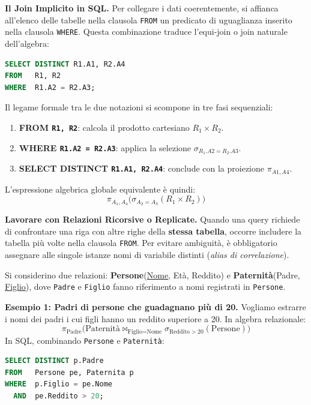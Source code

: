 \documentclass[12pt]{extarticle}
\begin{document}
\medskip
\noindent \textbf{Il Join Implicito in SQL.} Per collegare i dati coerentemente, si affianca all'elenco delle tabelle nella clausola \texttt{FROM} un predicato di uguaglianza inserito nella clausola \texttt{WHERE}. Questa combinazione traduce l'equi-join o join naturale dell'algebra:
\begin{lstlisting}[language=SQL]
SELECT DISTINCT R1.A1, R2.A4
FROM   R1, R2
WHERE  R1.A2 = R2.A3;
\end{lstlisting}

\medskip
\noindent Il legame formale tra le due notazioni si scompone in tre fasi sequenziali:
\begin{enumerate}
    \item \textbf{FROM \texttt{R1, R2}}: calcola il prodotto cartesiano $R_1 \times R_2$.
    \item \textbf{WHERE \texttt{R1.A2 = R2.A3}}: applica la selezione $\sigma_{R_1.A2 = R_2.A3}$.
    \item \textbf{SELECT DISTINCT \texttt{R1.A1, R2.A4}}: conclude con la proiezione $\pi_{A1, A4}$.
\end{enumerate}
L'espressione algebrica globale equivalente è quindi:
\[
\pi_{A_1, A_4}\big(\sigma_{A_2 = A_3}(R_1 \times R_2)\big)
\]

\noindent \textbf{Lavorare con Relazioni Ricorsive o Replicate.} Quando una query richiede di confrontare una riga con altre righe della \textbf{stessa tabella}, occorre includere la tabella più volte nella clausola \texttt{FROM}. Per evitare ambiguità, è obbligatorio assegnare alle singole istanze nomi di variabile distinti (\textit{alias di correlazione}).

\medskip
\noindent Si considerino due relazioni: \textbf{Persone}(\underline{Nome}, Età, Reddito) e \textbf{Paternità}(Padre, \underline{Figlio}), dove \texttt{Padre} e \texttt{Figlio} fanno riferimento a nomi registrati in \texttt{Persone}.

\medskip
\noindent \textbf{Esempio 1: Padri di persone che guadagnano più di 20.}
Vogliamo estrarre i nomi dei padri i cui figli hanno un reddito superiore a 20. In algebra relazionale:
\[
\pi_{\text{Padre}}\big(\text{Paternità} \bowtie_{\text{Figlio} = \text{Nome}} \sigma_{\text{Reddito} > 20}(\text{Persone})\big)
\]
In SQL, combinando \texttt{Persone} e \texttt{Paternità}:
\begin{lstlisting}[language=SQL]
SELECT DISTINCT p.Padre
FROM   Persone pe, Paternita p
WHERE  p.Figlio = pe.Nome
  AND  pe.Reddito > 20;
\end{lstlisting}
\end{document}
